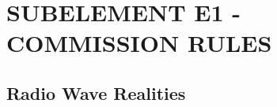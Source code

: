\documentclass[12pt]{book}
\begin{document}
\chapter{SUBELEMENT E1 - COMMISSION RULES}
\section{Radio Wave Realities}
\end{document}
